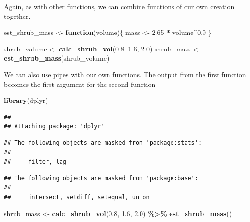\documentclass[
]{article}
\newenvironment{Shaded}{\begin{snugshade}}{\end{snugshade}}
\newcommand{\ControlFlowTok}[1]{\textcolor[rgb]{0.13,0.29,0.53}{\textbf{#1}}}
\newcommand{\FloatTok}[1]{\textcolor[rgb]{0.00,0.00,0.81}{#1}}
\newcommand{\FunctionTok}[1]{\textcolor[rgb]{0.13,0.29,0.53}{\textbf{#1}}}
\newcommand{\NormalTok}[1]{#1}
\newcommand{\OtherTok}[1]{\textcolor[rgb]{0.56,0.35,0.01}{#1}}
\newcommand{\SpecialCharTok}[1]{\textcolor[rgb]{0.81,0.36,0.00}{\textbf{#1}}}
\begin{document}
Again, as with other functions, we can combine functions of our own
creation together.

\begin{Shaded}
\begin{Highlighting}[]
\NormalTok{est\_shrub\_mass }\OtherTok{\textless{}{-}} \ControlFlowTok{function}\NormalTok{(volume)\{}
\NormalTok{  mass }\OtherTok{\textless{}{-}} \FloatTok{2.65} \SpecialCharTok{*}\NormalTok{ volume}\SpecialCharTok{\^{}}\FloatTok{0.9}
\NormalTok{\}}

\NormalTok{shrub\_volume }\OtherTok{\textless{}{-}} \FunctionTok{calc\_shrub\_vol}\NormalTok{(}\FloatTok{0.8}\NormalTok{, }\FloatTok{1.6}\NormalTok{, }\FloatTok{2.0}\NormalTok{)}
\NormalTok{shrub\_mass }\OtherTok{\textless{}{-}} \FunctionTok{est\_shrub\_mass}\NormalTok{(shrub\_volume)}
\end{Highlighting}
\end{Shaded}

We can also use pipes with our own functions. The output from the first
function becomes the first argument for the second function.

\begin{Shaded}
\begin{Highlighting}[]
\FunctionTok{library}\NormalTok{(dplyr)}
\end{Highlighting}
\end{Shaded}

\begin{verbatim}
## 
## Attaching package: 'dplyr'
\end{verbatim}

\begin{verbatim}
## The following objects are masked from 'package:stats':
## 
##     filter, lag
\end{verbatim}

\begin{verbatim}
## The following objects are masked from 'package:base':
## 
##     intersect, setdiff, setequal, union
\end{verbatim}

\begin{Shaded}
\begin{Highlighting}[]
\NormalTok{shrub\_mass }\OtherTok{\textless{}{-}} \FunctionTok{calc\_shrub\_vol}\NormalTok{(}\FloatTok{0.8}\NormalTok{, }\FloatTok{1.6}\NormalTok{, }\FloatTok{2.0}\NormalTok{) }\SpecialCharTok{\%\textgreater{}\%} 
  \FunctionTok{est\_shrub\_mass}\NormalTok{()}
\end{Highlighting}
\end{Shaded}
\end{document}
